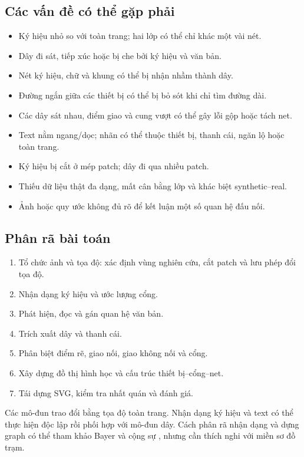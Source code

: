 \documentclass[11pt,a4paper]{article}
\begin{document}
\subsection{Các vấn đề có thể gặp phải}
\begin{itemize}
  \item Ký hiệu nhỏ so với toàn trang; hai lớp có thể chỉ khác một vài nét.
  \item Dây đi sát, tiếp xúc hoặc bị che bởi ký hiệu và văn bản.
  \item Nét ký hiệu, chữ và khung có thể bị nhận nhầm thành dây.
  \item Đường ngắn giữa các thiết bị có thể bị bỏ sót khi chỉ tìm đường dài.
  \item Các dây sát nhau, điểm giao và cung vượt có thể gây lỗi gộp hoặc tách net.
  \item Text nằm ngang/dọc; nhãn có thể thuộc thiết bị, thanh cái, ngăn lộ hoặc toàn trang.
  \item Ký hiệu bị cắt ở mép patch; dây đi qua nhiều patch.
  \item Thiếu dữ liệu thật đa dạng, mất cân bằng lớp và khác biệt synthetic--real.
  \item Ảnh hoặc quy ước không đủ rõ để kết luận một số quan hệ đấu nối.
\end{itemize}

\subsection{Phân rã bài toán}
\begin{enumerate}
  \item Tổ chức ảnh và tọa độ: xác định vùng nghiên cứu, cắt patch và lưu phép đổi tọa độ.
  \item Nhận dạng ký hiệu và ước lượng cổng.
  \item Phát hiện, đọc và gán quan hệ văn bản.
  \item Trích xuất dây và thanh cái.
  \item Phân biệt điểm rẽ, giao nối, giao không nối và cổng.
  \item Xây dựng đồ thị hình học và cấu trúc thiết bị--cổng--net.
  \item Tái dựng SVG, kiểm tra nhất quán và đánh giá.
\end{enumerate}
Các mô-đun trao đổi bằng tọa độ toàn trang. Nhận dạng ký hiệu và text có thể thực hiện độc lập rồi phối hợp với mô-đun dây. Cách phân rã nhận dạng và dựng graph có thể tham khảo Bayer và cộng sự \cite{bayer2024}, nhưng cần thích nghi với miền sơ đồ trạm.
\end{document}
